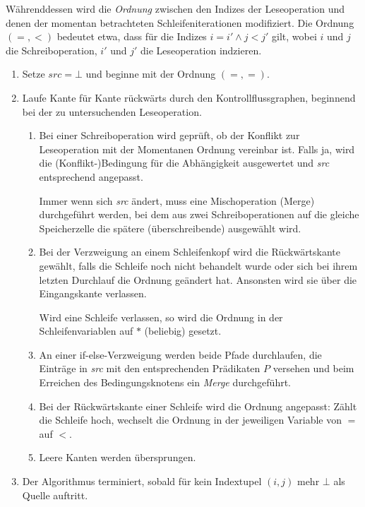 \documentclass[a4paper,10pt]{article}
\begin{document}
Währenddessen wird die \textit{Ordnung} zwischen den Indizes der Leseoperation und denen der momentan betrachteten Schleifeniterationen modifiziert. Die Ordnung $(=,<)$ bedeutet etwa, dass für die Indizes $i=i'\wedge j<j'$ gilt, wobei $i$ und $j$ die Schreiboperation, $i'$ und $j'$ die Leseoperation indzieren.
\begin{enumerate}
    \item Setze $\mathit{src}={\bot}$ und beginne mit der Ordnung $(=,=)$.
    \item Laufe Kante für Kante rückwärts durch den Kontrollflussgraphen, beginnend bei der zu untersuchenden Leseoperation.
        \begin{enumerate}
            \item Bei einer Schreiboperation wird geprüft, ob der Konflikt zur Leseoperation mit der Momentanen Ordnung vereinbar ist. Falls ja, wird die (Konflikt-)Bedingung für die Abhängigkeit ausgewertet und \textit{src} entsprechend angepasst.

                Immer wenn sich \textit{src} ändert, muss eine Mischoperation (Merge) durchgeführt werden, bei dem aus zwei Schreiboperationen auf die gleiche Speicherzelle die spätere (überschreibende) ausgewählt wird.
            \item Bei der Verzweigung an einem Schleifenkopf wird die Rückwärtskante gewählt, falls die Schleife noch nicht behandelt wurde oder sich bei ihrem letzten Durchlauf die Ordnung geändert hat. Ansonsten wird sie über die Eingangskante verlassen.

                Wird eine Schleife verlassen, so wird die Ordnung in der Schleifenvariablen auf $*$ (beliebig) gesetzt.
            \item An einer if-else-Verzweigung werden beide Pfade durchlaufen, die Einträge in \textit{src} mit
                den entsprechenden Prädikaten $P$ versehen und beim Erreichen des Bedingungsknotens ein \textit{Merge} durchgeführt.
            \item Bei der Rückwärtskante einer Schleife wird die Ordnung angepasst: Zählt die Schleife hoch, wechselt die Ordnung in der jeweiligen Variable von $=$ auf $<$.
            \item Leere Kanten werden übersprungen.
        \end{enumerate}
    \item Der Algorithmus terminiert, sobald für kein Indextupel $(i,j)$ mehr $\bot$ als Quelle auftritt.
\end{enumerate}
\end{document}
